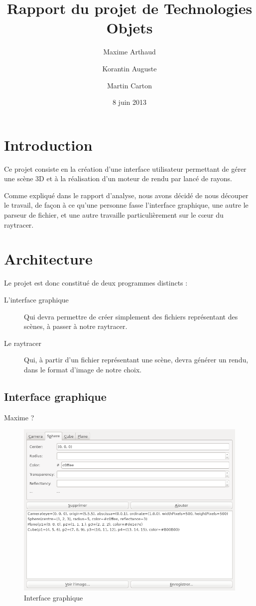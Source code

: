 \documentclass[a4paper]{article}
\title{Rapport du projet de Technologies Objets}
\author{Maxime Arthaud \and Korantin Auguste \and Martin Carton}
\date{8 juin 2013}
\begin{document}
\maketitle

\section{Introduction}
  Ce projet consiste en la création d'une interface utilisateur permettant de
  gérer une scène 3D et à la réalisation d'un moteur de rendu par lancé de
  rayons.

  Comme expliqué dans le rapport d'analyse, nous avons décidé de nous découper le travail, de façon à ce qu'une personne fasse l'interface graphique,
  une autre le parseur de fichier, et une autre travaille particulièrement sur le cœur du raytracer.

\section{Architecture}
  Le projet est donc constitué de deux programmes distincts :
  \begin{description}
      \item[L'interface graphique] Qui devra permettre de créer simplement des fichiers représentant des scènes, à passer à notre raytracer.
      \item[Le raytracer] Qui, à partir d'un fichier représentant une scène, devra générer un rendu, dans le format d'image de notre choix.
  \end{description}


\subsection{Interface graphique}

Maxime ?

    \begin{figure}[p]
      \centerline{\includegraphics[width=1.2\textwidth]{gui.png}}
    \caption{Interface graphique\label{fig:gui}}
    \end{figure}
\end{document}
